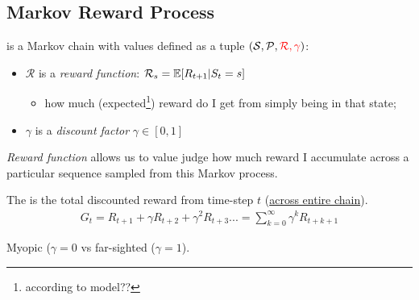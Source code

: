 \subsection{Markov Reward Process}
	
 is a Markov chain with values defined as a tuple $(\mathcal{S}, \mathcal{P}, \textcolor{red}{\mathcal{R}, \mathcal{\gamma}})$:
\begin{itemize}
	\item $\mathcal{R}$ is a \emph{reward function}: $\mathcal{R}_s = \operatorname{\mathbb{E}}[R_{t+1} | S_t = s]$
	\begin{itemize}
		\item how much (expected\footnote{according to model??}) reward do I get from simply being in that state;
	\end{itemize}
	\item $\gamma$ is a \emph{discount factor} $\gamma \in [0, 1]$
\end{itemize}
\emph{Reward function} allows us to value judge how much reward I accumulate across a particular sequence sampled from this Markov process.

The  is the total discounted reward from time-step $t$ (\underline{across entire chain}).
\begin{align}
	G_t = R_{t+1}+ \gamma R_{t+2} + \gamma^2 R_{t+3} ... = \sum_{k=0}^{\infty} \gamma^k R_{t+k+1}
\end{align}

\begin{mynote}
	 Myopic ($\gamma=0$ vs far-sighted ($\gamma=1$). 
\end{mynote}